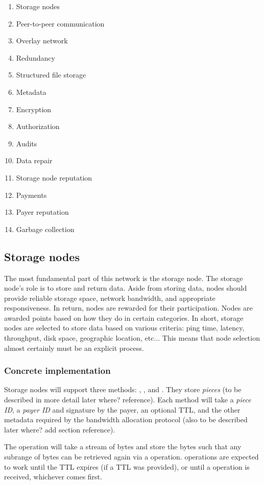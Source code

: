 \documentclass[a4paper,10pt]{article} \usepackage[utf8]{inputenc}
\newcommand{\bs}[1]{{\color{red}#1}}
\begin{document}
\begin{enumerate}
\item Storage nodes
\item Peer-to-peer communication
\item Overlay network
\item Redundancy
\item Structured file storage
\item Metadata
\item Encryption
\item Authorization
\item Audits
\item Data repair
\item Storage node reputation
\item Payments
\item Payer reputation
\item Garbage collection
\end{enumerate}

\subsection{Storage nodes}

The most fundamental part of this network is the storage node.  The storage node's role is to store and return data.  Aside from storing data,
nodes should provide reliable storage space, network bandwidth, and appropriate responsiveness. In return, nodes are rewarded
for their participation. Nodes are awarded points based on how they do in certain categories. In short, storage nodes are selected to store data based on various criteria:  ping time, latency, throughput, disk space, geographic location, etc...  This means that node selection almost certainly must be an explicit process.

\subsubsection{Concrete implementation}

Storage nodes will support three methods: , , and
. They store {\em pieces} (to be described in more detail
later \bs{where? reference}). Each method will take a {\em piece ID}, a 
{\em payer ID} and signature
by the payer, an optional TTL, and the other metadata required by the bandwidth
allocation protocol (also to be described later \bs{where? add section reference}).

The  operation will take a stream of bytes and store the bytes such
that any subrange of bytes can be retrieved again via a  operation.
 operations are expected to work until the TTL expires (if a TTL was
provided), or until a  operation is received, whichever comes
first.
\end{document}
